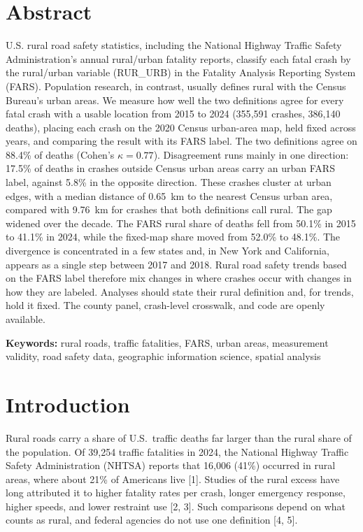 \documentclass[12pt]{article}
\begin{document}
\section*{Abstract}
U.S. rural road safety statistics, including the National Highway Traffic Safety Administration's annual rural/urban fatality reports, classify each fatal crash by the rural/urban variable (RUR\_URB) in the Fatality Analysis Reporting System (FARS). Population research, in contrast, usually defines rural with the Census Bureau's urban areas. We measure how well the two definitions agree for every fatal crash with a usable location from 2015 to 2024 (355{,}591 crashes, 386{,}140 deaths), placing each crash on the 2020 Census urban-area map, held fixed across years, and comparing the result with its FARS label. The two definitions agree on 88.4\% of deaths (Cohen's $\kappa = 0.77$). Disagreement runs mainly in one direction: 17.5\% of deaths in crashes outside Census urban areas carry an urban FARS label, against 5.8\% in the opposite direction. These crashes cluster at urban edges, with a median distance of 0.65~km to the nearest Census urban area, compared with 9.76~km for crashes that both definitions call rural. The gap widened over the decade. The FARS rural share of deaths fell from 50.1\% in 2015 to 41.1\% in 2024, while the fixed-map share moved from 52.0\% to 48.1\%. The divergence is concentrated in a few states and, in New York and California, appears as a single step between 2017 and 2018. Rural road safety trends based on the FARS label therefore mix changes in where crashes occur with changes in how they are labeled. Analyses should state their rural definition and, for trends, hold it fixed. The county panel, crash-level crosswalk, and code are openly available.\par\medskip
\noindent\textbf{Keywords:} rural roads, traffic fatalities, FARS, urban areas, measurement validity, road safety data, geographic information science, spatial analysis


\section{Introduction}

Rural roads carry a share of U.S.\ traffic deaths far larger than the rural share of the population. Of 39{,}254 traffic fatalities in 2024, the National Highway Traffic Safety Administration (NHTSA) reports that 16{,}006 (41\%) occurred in rural areas, where about 21\% of Americans live [1]. Studies of the rural excess have long attributed it to higher fatality rates per crash, longer emergency response, higher speeds, and lower restraint use [2, 3]. Such comparisons depend on what counts as rural, and federal agencies do not use one definition [4, 5].
\end{document}
